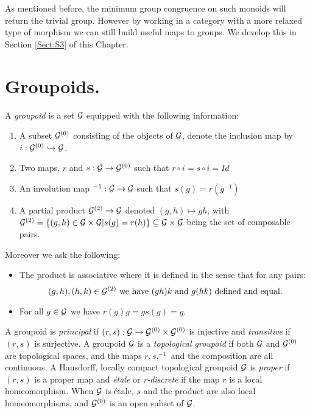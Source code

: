 As mentioned before, the minimum group congruence on such monoids will return the trivial group. However by working in a category with a more relaxed type of morphism we can still build useful maps to groups. We develop this in Section \ref{Sect:S3} of this Chapter.

\section{Groupoids.}

\begin{definition}\label{def:grpoid2}
A \textit{groupoid} is a set $\mathcal{G}$ equipped with the following information:
\begin{enumerate}
\item A subset $\mathcal{G}^{(0)}$ consisting of the objects of $\mathcal{G}$, denote the inclusion map by $i: \mathcal{G}^{(0)}\hookrightarrow \mathcal{G}$. 
\item Two maps, $r$ and $s: \mathcal{G}  \rightarrow \mathcal{G}^{(0)}$ such that $r\circ i = s \circ i = Id$ 
\item An involution map $^{-1}:\mathcal{G} \rightarrow \mathcal{G}$ such that $s(g)=r(g^{-1})$
\item A partial product $\mathcal{G}^{(2)} \rightarrow \mathcal{G}$ denoted $(g,h) \mapsto gh$, with $\mathcal{G}^{(2)}=\lbrace (g,h) \in \mathcal{G} \times \mathcal{G} | s(g)=r(h) \rbrace\subseteq \mathcal{G}\times \mathcal{G}$ being the set of composable pairs.
\end{enumerate}
Moreover we ask the following:
\begin{itemize}
\item The product is associative where it is defined in the sense that for any pairs: 
\begin{equation*}
(g,h),(h,k)\in \mathcal{G}^{(2)} \mbox{ we have }(gh)k \mbox{ and } g(hk) \mbox{ defined and equal}.
\end{equation*}
\item For all $g \in \mathcal{G}$ we have $r(g)g=gs(g)=g$.
\end{itemize}
\end{definition}

A groupoid is \textit{principal} if $(r,s): \mathcal{G} \rightarrow \mathcal{G}^{(0)} \times \mathcal{G}^{(0)}$ is injective and \textit{transitive} if $(r,s)$ is surjective. A groupoid $\mathcal{G}$ is a \textit{topological groupoid} if both $\mathcal{G}$ and $\mathcal{G}^{(0)}$ are topological spaces, and the maps $r,s, ^{-1}$ and the composition are all continuous. A Hausdorff, locally compact topological groupoid $\mathcal{G}$ is \textit{proper} if $(r,s)$ is a proper map and \textit{\'etale} or \textit{r-discrete} if the map $r$ is a local homeomorphism. When $\mathcal{G}$ is \'etale, $s$ and the product are also local homeomorphisms, and $\mathcal{G}^{(0)}$ is an open subset of $\mathcal{G}$.

